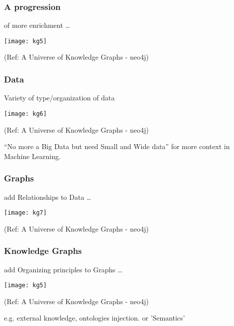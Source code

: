 \begin{frame}[fragile]\frametitle{A progression}
 
 of more enrichment \ldots
 
			\begin{center}
			\texttt{[image: kg5]}
			\end{center}	
			
			{\tiny (Ref: A Universe of Knowledge Graphs - neo4j)}
		
\end{frame}

\begin{frame}[fragile]\frametitle{Data}
 
 Variety of type/organization of data
 
			\begin{center}
			\texttt{[image: kg6]}
			\end{center}	
			
			{\tiny (Ref: A Universe of Knowledge Graphs - neo4j)}
		
		
		``No more a Big Data but need Small and Wide data'' for more context in Machine Learning.
		
\end{frame}

\begin{frame}[fragile]\frametitle{Graphs}
 
 add Relationships to Data \ldots
 
 
			\begin{center}
			\texttt{[image: kg7]}
			\end{center}	
			
			{\tiny (Ref: A Universe of Knowledge Graphs - neo4j)}
		
		
\end{frame}

\begin{frame}[fragile]\frametitle{Knowledge Graphs}
 
 add Organizing principles to Graphs \ldots
 
 
			\begin{center}
			\texttt{[image: kg5]}
			\end{center}	
			
			{\tiny (Ref: A Universe of Knowledge Graphs - neo4j)}
		
		e.g. external knowledge, ontologies injection. or 'Semantics'
		
\end{frame}



